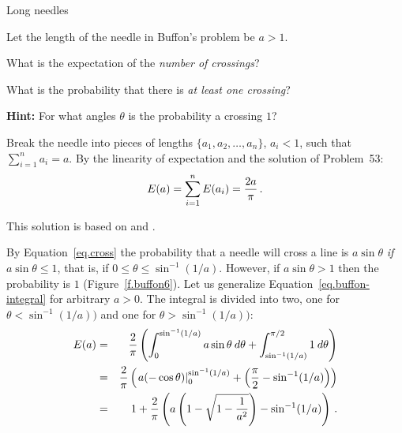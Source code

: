 
\begin{prob}{Long needles}

Let the length of the needle in Buffon's problem be $a>1$.

 What is the expectation of the \emph{number of crossings}?

 What is the probability that there is \emph{at least one crossing}?

\textbf{Hint:} For what angles $\theta$ is the probability a crossing $1$?

\end{prob}

\solution{}

 Break the needle into pieces of lengths $\{a_1,a_2,\ldots, a_n\}$, $a_i< 1$, such that $\sum_{i=1}^n a_i=a$. By the linearity of expectation and the solution of Problem~53:
\[
E(a)= \sum_{i=1}^n E(a_i)= \displaystyle\frac{2a}{\pi}\,.
\]

 This solution is based on \cite{wiki-buffon} and \cite[Chapter~26]{proofs}.

By Equation~\ref{eq.cross} the probability that a needle will cross a line is $a\sin\theta$ \emph{if} $a\sin\theta \leq 1$, that is, if $0\leq\theta\leq\sin^{-1}(1/a)$. However, if $a\sin\theta > 1$ then the probability is $1$ (Figure~\ref{f.buffon6}). Let us generalize Equation~\ref{eq.buffon-integral} for arbitrary $a>0$. The integral is divided into two, one for $\theta<\sin^{-1}(1/a))$ and one for $\theta>\sin^{-1}(1/a))$:
\begin{eqnarray*}
E(a) &=& \displaystyle\frac{2}{\pi}
   \left(\int_{0}^{\sin^{-1}(1/a)} 
   a\sin \theta\:d\theta + 
   \int_{\sin^{-1}(1/a)}^{\pi/2} 1\: d\theta\right)\\
&=& \displaystyle\frac{2}{\pi}\left(\left.
    a(-\cos \theta)\right|_0^{\sin^{-1}(1/a)} + 
    \left(\displaystyle\frac{\pi}{2} - 
    \sin^{-1}(1/a)\right)\right)\\
&=& 1+\displaystyle\frac{2}{\pi}
  \left(a
  \left(1-\sqrt{1-\displaystyle\frac{1}{a^2}}\right)-
  \sin^{-1}(1/a)\right)\,.
\end{eqnarray*}


